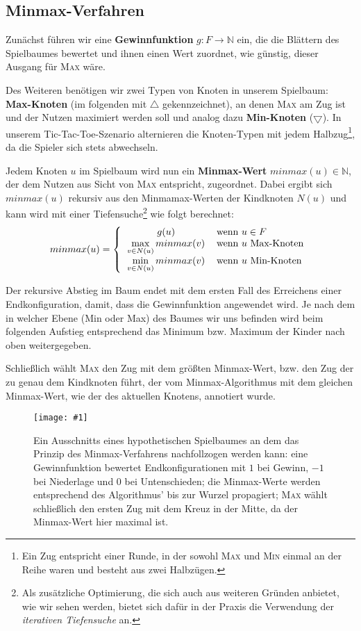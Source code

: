 \documentclass[a4paper,twoside]{scrartcl}
\newcommand\g[3]{%
  \begin{figure}[!ht]
  \centering
  \texttt{[image: \#1]}
  \caption{#2}
  \end{figure}}
\begin{document}
\subsection{Minmax-Verfahren}

Zunächst führen wir eine \textbf{Gewinnfunktion} $g: F \to \mathbb{N}$ ein, die die Blättern des Spielbaumes bewertet und ihnen einen Wert zuordnet, wie günstig, dieser Ausgang für \textsc{Max} wäre.

Des Weiteren benötigen wir zwei Typen von Knoten in unserem Spielbaum: \textbf{Max-Knoten} (im folgenden mit $\bigtriangleup$ gekennzeichnet), an denen \textsc{Max} am Zug ist und der Nutzen maximiert werden soll und analog dazu \textbf{Min-Knoten} ($\bigtriangledown$). In unserem Tic-Tac-Toe-Szenario alternieren die Knoten-Typen mit jedem Halbzug\footnote{Ein Zug entspricht einer Runde, in der sowohl \textsc{Max} und \textsc{Min} einmal an der Reihe waren und besteht aus zwei Halbzügen.}, da die Spieler sich stets abwechseln. 

Jedem Knoten $u$ im Spielbaum wird nun ein \textbf{Minmax-Wert} $minmax(u) \in \mathbb{N}$, der dem Nutzen aus Sicht von \textsc{Max} entspricht, zugeordnet. Dabei ergibt sich $minmax(u)$ rekursiv aus den Minmamax-Werten der Kindknoten $N(u)$ und kann wird mit einer Tiefensuche\footnote{Als zusätzliche Optimierung, die sich auch aus weiteren Gründen anbietet, wie wir sehen werden, bietet sich dafür in der Praxis die Verwendung der \textit{iterativen Tiefensuche} an.} wie folgt berechnet:
\[
  minmax(u) = \left\{
  \begin{tabular}{cl}
    $g(u)$ & wenn $u \in F$\\
    $\max\limits_{v \in N(u)} minmax(v)$ & wenn $u$ Max-Knoten\\
    $\min\limits_{v \in N(u)} minmax(v)$ & wenn $u$ Min-Knoten
  \end{tabular}\right.
\]

Der rekursive Abstieg im Baum endet mit dem ersten Fall des Erreichens einer Endkonfiguration, damit, dass die Gewinnfunktion angewendet wird. Je nach dem in welcher Ebene (Min oder Max) des Baumes wir uns befinden wird beim folgenden Aufstieg entsprechend das Minimum bzw. Maximum der Kinder nach oben weitergegeben.

Schließlich wählt \textsc{Max} den Zug mit dem größten Minmax-Wert, bzw. den Zug der zu genau dem Kindknoten führt, der vom Minmax-Algorithmus mit dem gleichen Minmax-Wert, wie der des aktuellen Knotens, annotiert wurde.

\g{img/tic_minmax_2.pdf}{Ein Ausschnitts eines hypothetischen Spielbaumes an dem das Prinzip des Minmax-Verfahrens nachfollzogen werden kann: eine Gewinnfunktion bewertet Endkonfigurationen mit $1$ bei Gewinn, $-1$ bei Niederlage und $0$ bei Untenschieden; die Minmax-Werte werden entsprechend des Algorithmus' bis zur Wurzel propagiert; \textsc{Max} wählt schließlich den ersten Zug mit dem Kreuz in der Mitte, da der Minmax-Wert hier maximal ist.}{0.4}
\end{document}
